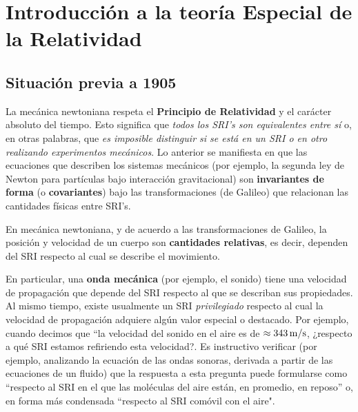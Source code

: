 \chapter{Introducción a la teoría Especial de la Relatividad}

\section{Situación previa a 1905}

La mecánica newtoniana respeta el \textbf{Principio de Relatividad} y el carácter absoluto del tiempo. Esto significa que \textit{todos los SRI's son equivalentes entre sí} o, en otras palabras, que \textit{es imposible distinguir si se está en un SRI o en otro realizando experimentos mecánicos}.
Lo anterior se manifiesta en que las ecuaciones que describen los sistemas mecánicos (por ejemplo, la segunda ley de Newton para partículas bajo interacción gravitacional) son \textbf{invariantes de forma} (o \textbf{covariantes}) bajo las transformaciones (de Galileo) que relacionan las cantidades físicas entre SRI's.

En mecánica newtoniana, y de acuerdo a las transformaciones de Galileo, la
posición y velocidad de un cuerpo  son \textbf{cantidades relativas}, es decir, dependen del SRI respecto al cual se describe el movimiento.

En particular, una \textbf{onda mecánica} (por ejemplo, el sonido) tiene una velocidad de propagación que depende del SRI respecto al que se describan sus propiedades. Al mismo tiempo, existe usualmente un SRI \textit{privilegiado} respecto al cual la velocidad de propagación adquiere algún valor especial o destacado.
Por ejemplo, cuando decimos que ``la velocidad del sonido en el aire es de $\approx 343\,\rm m/s$, ¿respecto a qué SRI estamos refiriendo esta velocidad?. Es instructivo verificar (por ejemplo, analizando la ecuación de las ondas sonoras, derivada a partir de las ecuaciones de un fluido) que la respuesta a esta pregunta puede formularse como ``respecto al SRI en el que las moléculas del aire están, en promedio, en reposo'' o, en forma más condensada ``respecto al SRI comóvil con el aire".

